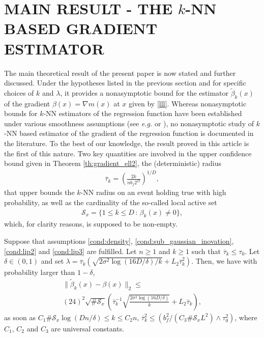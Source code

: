 \section{MAIN RESULT - THE $k$-NN BASED GRADIENT ESTIMATOR}\label{sec:main}



The main theoretical result of the present paper is now stated and further discussed. Under the hypotheses listed in the previous section and for specific choices of $k$ and $\lambda$, it provides a nonasymptotic bound for the estimator $\tilde{\beta}_k(x)$ of the gradient $\beta(x)=\nabla m(x)$ at $x$ given by \eqref{lll}. Whereas nonasymptotic bounds for $k$-NN estimators of the regression function have been established under various smoothness assumptions (see \textit{e.g.} \cite{jiangNonAsymptoticUniformRates2019} or \cite{kpotufeKNNRegressionAdapts2011}), no nonasymptotic study of $k$-NN based estimator of the gradient of the regression function is documented in the literature. To the best of our knowledge, the result proved in this article is the first of this nature. Two key quantities are involved in the upper confidence bound given in Theorem \ref{th:gradient_ell2}, the (deterministic) radius 
\begin{align*}
\overline{\tau} _ k =  \left (\frac{ 2  k }{ n b_f2^D}  \right)^{ 1/ D} ,
\end{align*}
that upper bounds the $k$-NN radius on an event holding true with high probability, as well as the cardinality of the so-called local active set
\begin{align*}
\mathcal S_x = \{  1\leq k\leq D  \, : \, \beta_ k (x) \neq 0\} ,
\end{align*}
which, for clarity reasons, is supposed to be non-empty.

 


\begin{theorem}\label{th:gradient_ell2}
Suppose that assumptions \ref{cond:density}, \ref{cond:sub_gaussian_inovation}, \ref{cond:lip2} and \ref{cond:lip3} are fulfilled. Let $n\geq 1$ and $k\geq 1$ such that $\overline{\tau} _ k\leq \tau_0$.  Let $\delta\in (0,1)$ and set  $\lambda =  \overline{\tau} _ k  ( \sqrt{ 2   \sigma^2   \log(16D/\delta)/k } + L_2 \overline{\tau} _ k^2 )$. Then, we have with probability larger than $1-\delta$,
\begin{multline}\label{eq:main_bound}
\lVert  \tilde{\beta}_k  (x) - \beta(x)  \rVert _ 2\leq \\
(24)^2  \sqrt{\#\mathcal S_x }    \left(  \overline \tau_k ^{-1} \sqrt{\frac{ 2   \sigma^2   \log(16D/\delta)}{k} } + L_2 \overline \tau_k  \right),
\end{multline}
as soon as $C_1  \#\mathcal S_x \log(  D n / \delta)   \leq k  \leq  C_2  n $,   $  \overline\tau_k   ^{2}     \leq  (   b_f^2 /( C_3 \#\mathcal S_x L ^2 )  \wedge \tau_0 ^2 )$, where $C_1$, $C_2$ and $C_3$ are universal constants.
\end{theorem}




